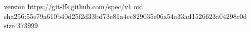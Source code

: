 version https://git-lfs.github.com/spec/v1
oid sha256:55e79a610b40d25f2d33bd73e81a4ee829035e06a54a33ad1526623a04298c0d
size 373999
